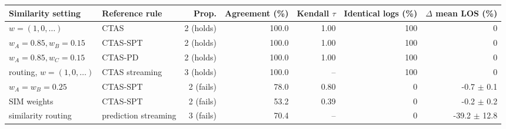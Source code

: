 \begin{tabular}{llrrrrr}
\toprule
Similarity setting & Reference rule & Prop. & Agreement (\%) & Kendall $\tau$ & Identical logs (\%) & $\Delta$ mean LOS (\%) \\
\midrule
$w=(1,0,\dots)$ & CTAS & 2 (holds) & 100.0 & 1.00 & 100 & $0$ \\
$w_A=0.85, w_B=0.15$ & CTAS-SPT & 2 (holds) & 100.0 & 1.00 & 100 & $0$ \\
$w_A=0.85, w_C=0.15$ & CTAS-PD & 2 (holds) & 100.0 & 1.00 & 100 & $0$ \\
routing, $w=(1,0,\dots)$ & CTAS streaming & 3 (holds) & 100.0 & -- & 100 & $0$ \\
$w_A=w_B=0.25$ & CTAS-SPT & 2 (fails) & 78.0 & 0.80 & 0 & -0.7 $\pm$ 0.1 \\
SIM weights & CTAS-SPT & 2 (fails) & 53.2 & 0.39 & 0 & -0.2 $\pm$ 0.2 \\
similarity routing & prediction streaming & 3 (fails) & 70.4 & -- & 0 & -39.2 $\pm$ 12.8 \\
\bottomrule
\end{tabular}
